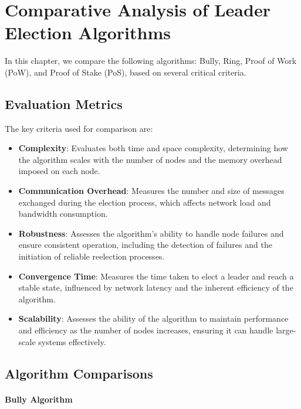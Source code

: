 \chapter{Comparative Analysis of Leader Election Algorithms}

In this chapter, we compare the following algorithms: Bully, Ring, Proof of Work (PoW), and Proof of Stake (PoS), based on several critical criteria.

\section{Evaluation Metrics}

The key criteria used for comparison are:

\begin{itemize}
    \item \textbf{Complexity}: Evaluates both time and space complexity, determining how the algorithm scales with the number of nodes and the memory overhead imposed on each node.
    \item \textbf{Communication Overhead}: Measures the number and size of messages exchanged during the election process, which affects network load and bandwidth consumption.
    \item \textbf{Robustness}: Assesses the algorithm's ability to handle node failures and ensure consistent operation, including the detection of failures and the initiation of reliable reelection processes.
    \item \textbf{Convergence Time}: Measures the time taken to elect a leader and reach a stable state, influenced by network latency and the inherent efficiency of the algorithm.
    \item \textbf{Scalability}: Assesses the ability of the algorithm to maintain performance and efficiency as the number of nodes increases, ensuring it can handle large-scale systems effectively.
\end{itemize}

\section{Algorithm Comparisons}
\subsubsection{Bully Algorithm}

